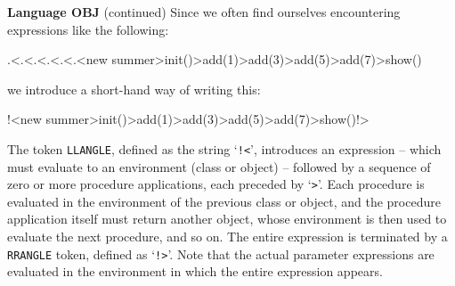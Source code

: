 \begin{minipage}[t]{\sw}
\slidenumber
\LARGE
{\bf Language OBJ} (continued)\exx
Since we often find ourselves encountering expressions like the following:
\Large
\begin{qv}
.<.<.<.<.<.<new summer>init()>add(1)>add(3)>add(5)>add(7)>show()
\end{qv}
\LARGE
we introduce a short-hand way of writing this:
\Large
\begin{qv}
!<new summer>init()>add(1)>add(3)>add(5)>add(7)>show()!>
\end{qv}
\LARGE
The token \verb'LLANGLE', defined as the string `\verb'!<'',
introduces an expression --
which must evaluate to an environment (class or object) --
followed by a sequence of zero or more procedure applications,
each preceded by `\verb'>''.
Each procedure is evaluated in the environment
of the previous class or object,
and the procedure application itself must return another object,
whose environment is then used to evaluate the next procedure,
and so on.
The entire expression is terminated
by a \verb'RRANGLE' token, defined as `\verb'!>''.
Note that the actual parameter expressions are evaluated
in the environment in which the entire expression appears.\exx
\end{minipage}
